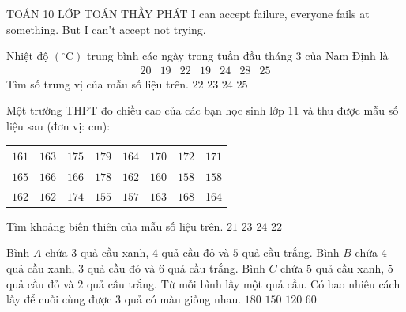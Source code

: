 \begin{name}
	{\tenchude}
	{TOÁN 10}
	{LỚP TOÁN THẦY PHÁT}
	{I can accept failure, everyone fails at something. But I can’t accept not trying.}
\end{name}
\TN
\begin{ex}%
Nhiệt độ $\left({}^{\circ}\mathrm{C}\right)$ trung bình các ngày trong tuần đầu tháng $3$ của Nam Định là
\[
\begin{array}{lllllll}
20 & 19 & 22 & 19 & 24 & 28 & 25
\end{array}
\]
Tìm số trung vị của mẫu số liệu trên.
\choice
{\True $22$}
{$23$}
{$24$}
{$25$}
\end{ex}

\begin{ex}%
Một trường THPT đo chiều cao của các bạn học sinh lớp $11$ và thu được mẫu số liệu sau (đơn vị: cm):
\begin{center}
\begin{tabular}{|c|c|c|c|c|c|c|c|}
\hline $161$& $163$ & $175$ & $179$ & $164$ & $170$ & $172$ & $171$ \\
\hline $165$ & $166$ & $166$ & $178$ & $162$ & $160$ & $158$ & $158$ \\
\hline $162$ & $162$ & $174$ & $155$ & $157$ & $163$ & $168$ & 1$64$ \\
\hline
\end{tabular}
\end{center}
Tìm khoảng biến thiên của mẫu số liệu trên.
\choice
{$21$}
{$23$}
{\True $24$}
{$22$}
\end{ex}

\begin{ex}%
Bình $A$ chứa $3$ quả cầu xanh, $4$ quả cầu đỏ và $5$ quả cầu trắng. Bình $B$ chứa $4$ quả cầu xanh, $3$ quả cầu đỏ và $6$ quả cầu trắng. Bình $C$ chứa $5$ quả cầu xanh, $5$ quả cầu đỏ và $2$ quả cầu trắng. Từ mỗi bình lấy một quả cầu. Có bao nhiêu cách lấy để cuối cùng được $3$ quả có màu giống nhau.
\choice
{\True $180$}
{$150$}
{$120$}
{$60$}
\end{ex}

